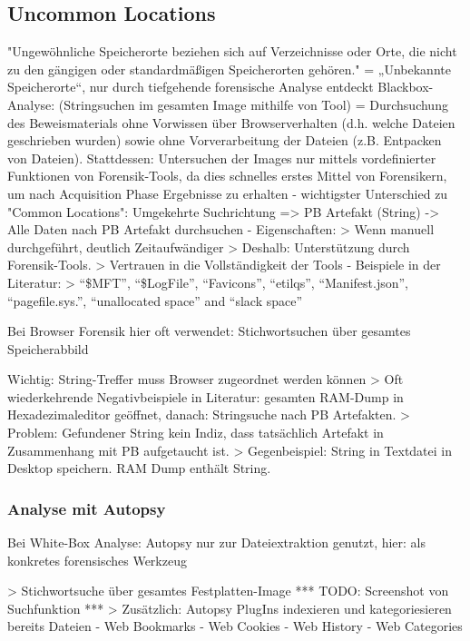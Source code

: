 \subsection{Uncommon Locations}

"Ungewöhnliche Speicherorte beziehen sich auf Verzeichnisse oder Orte, die nicht zu den gängigen oder standardmäßigen Speicherorten gehören."
= „Unbekannte Speicherorte“, nur durch tiefgehende forensische Analyse entdeckt
Blackbox-Analyse: \cite{Bonetti.2014} (Stringsuchen im gesamten Image mithilfe von Tool) 
= Durchsuchung des Beweismaterials ohne Vorwissen über Browserverhalten (d.h. welche Dateien geschrieben wurden) sowie ohne Vorverarbeitung der Dateien (z.B. Entpacken von Dateien).
Stattdessen: Untersuchen der Images nur mittels vordefinierter Funktionen von Forensik-Tools, da dies schnelles erstes Mittel von Forensikern, um nach Acquisition Phase Ergebnisse zu erhalten
- wichtigster Unterschied zu "Common Locations": Umgekehrte Suchrichtung => PB Artefakt (String) -> Alle Daten nach PB Artefakt durchsuchen
- Eigenschaften:
	> Wenn manuell durchgeführt, deutlich Zeitaufwändiger
	> Deshalb: Unterstützung durch Forensik-Tools. 
	> Vertrauen in die Vollständigkeit der Tools
- Beispiele in der Literatur:
	> “\$MFT”, “\$LogFile”, “Favicons”, “etilqs”, “Manifest.json”, “pagefile.sys.”, “unallocated space” and “slack space” \cite{Montasari.2015}	

Bei Browser Forensik hier oft verwendet: Stichwortsuchen über gesamtes Speicherabbild

Wichtig: String-Treffer muss Browser zugeordnet werden können
> Oft wiederkehrende Negativbeispiele in Literatur: gesamten RAM-Dump in Hexadezimaleditor geöffnet, danach: Stringsuche nach PB Artefakten. \cite{Rochmadi.2017, Md.2018, Montasari.2015}
> Problem: Gefundener String kein Indiz, dass tatsächlich Artefakt in Zusammenhang mit PB aufgetaucht ist.
> Gegenbeispiel: String in Textdatei in Desktop speichern. RAM Dump enthält String.

\subsubsection*{Analyse mit Autopsy}

Bei White-Box Analyse: Autopsy nur zur Dateiextraktion genutzt, hier: als konkretes forensisches Werkzeug

> Stichwortsuche über gesamtes Festplatten-Image
	*** TODO: Screenshot von Suchfunktion ***
> Zusätzlich: Autopsy PlugIns indexieren und kategoriesieren bereits Dateien
	- Web Bookmarks
	- Web Cookies
	- Web History
	- Web Categories

